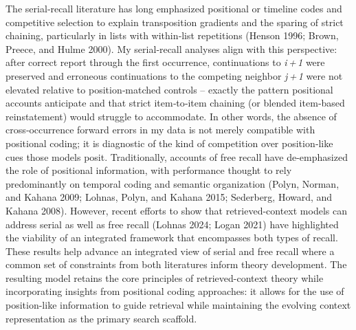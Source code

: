 \documentclass[
  letterpaper,
  11pt,
  english,
  singlespacing,
  headsepline]{MastersDoctoralThesis}
\begin{document}
The serial‑recall literature has long emphasized positional or timeline
codes and competitive selection to explain transposition gradients and
the sparing of strict chaining, particularly in lists with within‑list
repetitions (Henson 1996; Brown, Preece, and Hulme 2000). My
serial‑recall analyses align with this perspective: after correct report
through the first occurrence, continuations to \emph{i\,+\,1} were
preserved and erroneous continuations to the competing neighbor
\emph{j\,+\,1} were not elevated relative to position‑matched controls
-- exactly the pattern positional accounts anticipate and that strict
item‑to‑item chaining (or blended item‑based reinstatement) would
struggle to accommodate. In other words, the absence of cross‑occurrence
forward errors in my data is not merely compatible with positional
coding; it is diagnostic of the kind of competition over position‑like
cues those models posit. Traditionally, accounts of free recall have
de-emphasized the role of positional information, with performance
thought to rely predominantly on temporal coding and semantic
organization (Polyn, Norman, and Kahana 2009; Lohnas, Polyn, and Kahana
2015; Sederberg, Howard, and Kahana 2008). However, recent efforts to
show that retrieved-context models can address serial as well as free
recall (Lohnas 2024; Logan 2021) have highlighted the viability of an
integrated framework that encompasses both types of recall. These
results help advance an integrated view of serial and free recall where
a common set of constraints from both literatures inform theory
development. The resulting model retains the core principles of
retrieved-context theory while incorporating insights from positional
coding approaches: it allows for the use of position-like information to
guide retrieval while maintaining the evolving context representation as
the primary search scaffold.
\end{document}
